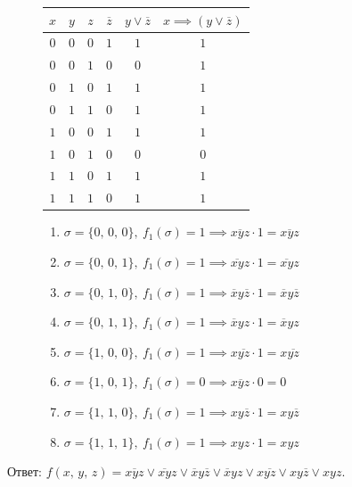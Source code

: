 \documentclass[12pt,a4paper]{article}
\theoremstyle{plain}
\theoremstyle{definition}
\theoremstyle{remark}
\numberwithin{equation}{section}
\begin{document}
\begin{figure}[H]
  \begin{minipage}[t]{0.38\textwidth}
    \vspace{0em}
    \begin{tabularx}{\textwidth}{|c|c|c|c|c|C|}
      \hline
      $x$ & $y$ & $z$ & $\overline{z}$ & $y \lor \overline{z}$ & $x \implies (y \lor \overline{z})$ \\
      \hline
      $0$ & $0$ & $0$ & $1$ & $1$ & $1$ \\
      $0$ & $0$ & $1$ & $0$ & $0$ & $1$ \\  
      $0$ & $1$ & $0$ & $1$ & $1$ & $1$ \\
      $0$ & $1$ & $1$ & $0$ & $1$ & $1$ \\
      $1$ & $0$ & $0$ & $1$ & $1$ & $1$ \\
      $1$ & $0$ & $1$ & $0$ & $0$ & $0$ \\
      $1$ & $1$ & $0$ & $1$ & $1$ & $1$ \\
      $1$ & $1$ & $1$ & $0$ & $1$ & $1$ \\
      \hline  
    \end{tabularx}    
    
    \vspace{0.5em}
  \end{minipage} \hfill 
  \begin{minipage}[t]{0.6\textwidth}
    \vspace{0em}
    \begin{enumerate}
      \item $\sigma = \{0,\,0,\,0\},\ f_1(\sigma) = 1 \implies \overline{xyz} \cdot 1 = \overline{xyz}$
      \item $\sigma = \{0,\,0,\,1\},\ f_1(\sigma) = 1 \implies \overline{xy}z \cdot 1 = \overline{xy}z$
      \item $\sigma = \{0,\,1,\,0\},\ f_1(\sigma) = 1 \implies \overline{x}y\overline{z} \cdot 1 = \overline{x}y\overline{z}$
      \item $\sigma = \{0,\,1,\,1\},\ f_1(\sigma) = 1 \implies \overline{x}yz \cdot 1 = \overline{x}yz$
      \item $\sigma = \{1,\,0,\,0\},\ f_1(\sigma) = 1 \implies x\overline{yz} \cdot 1 = x\overline{yz}$
      \item $\sigma = \{1,\,0,\,1\},\ f_1(\sigma) = 0 \implies x\overline{y}z \cdot 0 = 0$
      \item $\sigma = \{1,\,1,\,0\},\ f_1(\sigma) = 1 \implies xy\overline{z} \cdot 1 = xy\overline{z}$
      \item $\sigma = \{1,\,1,\,1\},\ f_1(\sigma) = 1 \implies xyz \cdot 1 = xyz$
    \end{enumerate}
  \end{minipage}
\end{figure}
\noindent Ответ: $f(x,\,y,\,z) = \overline{xyz} \lor \overline{xy}z \lor \overline{x}y\overline{z} \lor \overline{x}yz \lor x\overline{yz} \lor xy\overline{z} \lor xyz$.
\end{document}
